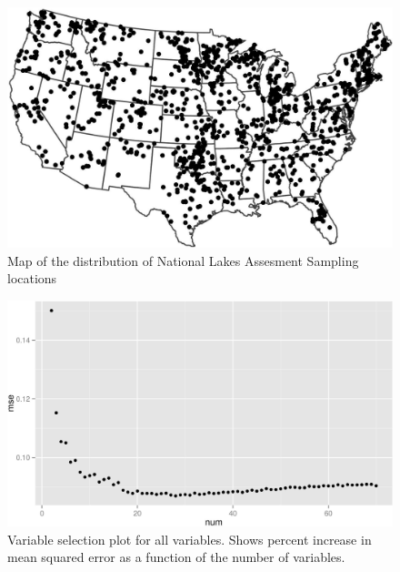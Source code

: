 \documentclass[11pt,]{article}
\begin{document}
\begin{figure}[htbp]
\centering
\includegraphics{manuscript_files/figure-latex/fig1_nlaMap-1.jpeg}
\caption{Map of the distribution of National Lakes Assesment Sampling
locations \label{fig:nlaMap}}
\end{figure}

\newpage

\begin{figure}[htbp]
\centering
\includegraphics{manuscript_files/figure-latex/all_var_sel_figure-1.jpeg}
\caption{Variable selection plot for all variables. Shows percent
increase in mean squared error as a function of the number of variables.
\label{fig:all_varsel_figure}}
\end{figure}

\newpage
\end{document}
